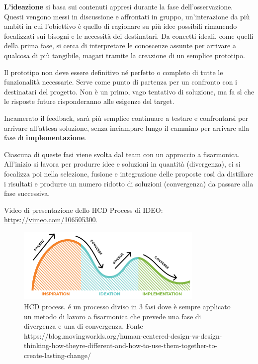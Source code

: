 \textbf{L'ideazione} si basa sui contenuti appresi durante la fase dell'osservazione. Questi vengono messi in discussione e affrontati in gruppo, un'interazione da più ambiti in cui l'obiettivo è quello di ragionare su più idee possibili rimanendo focalizzati sui bisogni e le necessità dei destinatari. Da concetti ideali, come quelli della prima fase, si cerca di interpretare le conoscenze assunte per arrivare a qualcosa di più tangibile, magari tramite la creazione di un semplice prototipo. 

Il prototipo non deve essere definitivo né perfetto o completo di tutte le funzionalità necessarie. Serve come punto di partenza per un confronto con i destinatari del progetto. Non è un primo, vago tentativo di soluzione, ma fa sì che le risposte future risponderanno alle esigenze del target.

Incamerato il feedback, sarà più semplice continuare a testare e confrontarsi per arrivare all'attesa soluzione, senza inciampare lungo il cammino per arrivare alla fase di \textbf{implementazione}.

Ciascuna di queste fasi viene svolta dal team con un approccio a fisarmonica. All'inizio si lavora per produrre idee e soluzioni in quantità (divergenza), ci si focalizza poi nella selezione, fusione e integrazione delle proposte così da distillare i risultati e produrre un numero ridotto di soluzioni (convergenza) da passare alla fase successiva.

Video di presentazione dello HCD Process di IDEO: \url{https://vimeo.com/106505300}.

\begin{figure}[!h]
	\centering
	\includegraphics[width=0.8\textwidth]{immagini/HCD-process.png}
	\caption{HCD process. é un processo diviso in 3 fasi dove è sempre applicato un metodo di lavoro a fisarmonica che prevede una fase di divergenza e una di convergenza. Fonte https://blog.movingworlds.org/human-centered-design-vs-design-thinking-how-theyre-different-and-how-to-use-them-together-to-create-lasting-change/} 
	\label{hcd-process}
\end{figure}

